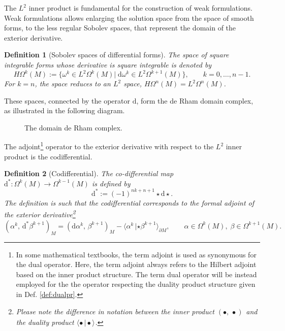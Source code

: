 \documentclass{elsarticle}
\newcommand{\revTwo}[1]{{\color{black}#1}}
\newtheorem{definition}{Definition}
\renewcommand\d{\ensuremath{\mathrm{d}}}
\newcommand{\inpr}[3][]{\ensuremath{( #2, \, #3 )_{#1}}}
\newcommand{\dualpr}[3][]{\ensuremath{\langle #2 \, \vert #3 \rangle_{#1}}}
\begin{document}
\revTwo{The $L^2$ inner product is fundamental for the construction of weak formulations. Weak formulations allows enlarging the solution space from the space of smooth forms, to the less regular Sobolev spaces, that represent the domain of the exterior derivative.
}



\begin{definition}[Sobolev spaces of differential forms]
The space of square integrable forms whose derivative is square integrable is denoted by
\begin{equation*}
    H\Omega^k(M) := \{\omega^k \in L^2 \Omega^k(M) \vert \; \d{\omega^k} \in L^2 \Omega^{k+1}(M)\}, \qquad k=0, \dots, n-1.
\end{equation*}
For $k=n$, the space reduces to an $L^2$ space, $H\Omega^n(M) = L^2\Omega^n(M)$.
\end{definition}
These spaces, connected by the operator $\d$, form the de Rham domain complex, as illustrated in the following diagram.
\begin{figure}[h]
\centering
{} 
\caption{The domain de Rham complex.}
\label{fig:cd_deRham}
\end{figure}

\revTwo{The adjoint\footnote{In some mathematical textbooks, the term adjoint is used as synonymous for the dual operator. Here, the term adjoint always refers to the Hilbert adjoint based on the inner product structure. The term dual operator will be instead employed for the the operator respecting the duality product structure given in Def. \ref{def:dualpr}.} operator to the exterior derivative with respect to the $L^2$ inner product is the codifferential.}

\begin{definition}[Codifferential]
    The co-differential map $\d^* : \Omega^k(M) \xrightarrow{} \Omega^{k-1}(M)$ is defined by
\begin{equation}\label{eq:codif}
        \d^* := (-1)^{nk + n + 1} {\star} \d {\star}.
\end{equation}
The definition is such that the codifferential corresponds to the formal  adjoint of the exterior derivative\footnote{Please note the difference in notation between the inner product $\inpr{\bullet}{\bullet}$ and the duality product $\dualpr{\bullet}{\bullet}$.}
\begin{equation}\label{eq:intbyparts_codif}
    \inpr[M]{\alpha^k}{\d^* \beta^{k+1}} = \inpr[M]{\mathrm{d} \alpha^{k}}{\beta^{k+1}} - \dualpr[\partial M]{\alpha^{k}}{{\star \beta^{k+1}}}, \qquad \alpha \in \Omega^k(M), \; \beta \in \Omega^{k+1}(M).
\end{equation}
\end{definition}
\end{document}
